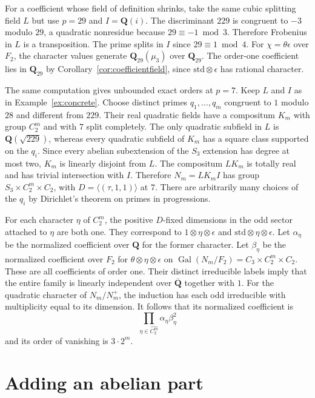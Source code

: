 \documentclass[11pt]{amsart}
\numberwithin{equation}{section}
\theoremstyle{definition}
\theoremstyle{remark}
\newcommand{\Q}{\mathbf Q}
\newcommand{\Qbar}{\overline{\mathbf Q}}
\newcommand{\Gal}{\operatorname{Gal}}
\begin{document}
For a coefficient whose field of definition shrinks,
take the same cubic splitting field $L$ but use $p=29$
and $I=\Q(i)$. The discriminant $229$ is congruent to
$-3$ modulo $29$, a quadratic nonresidue because
$29\equiv-1\bmod 3$. Therefore Frobenius in $L$ is a
transposition. The prime splits in $I$ since
$29\equiv1\bmod4$. For $\chi=\theta\epsilon$ over $F_2$,
the character values generate $\Q_{29}(\mu_3)$ over
$\Q_{29}$. The order-one coefficient lies in $\Q_{29}$
by Corollary~\ref{cor:coefficientfield}, since
$\mathrm{std}\otimes\epsilon$ has rational character.

The same computation gives unbounded exact orders at $p=7$.
Keep $L$ and $I$ as in
Example~\ref{ex:concrete}. Choose distinct primes
$q_1,\ldots,q_m$ congruent to $1$ modulo $28$ and different
from $229$. Their real quadratic fields have a compositum
$K_m$ with group $C_2^m$ and with $7$ split completely.
The only quadratic subfield in $L$ is $\Q(\sqrt{229})$,
whereas every quadratic subfield of $K_m$ has a square
class supported on the $q_i$. Since every abelian
subextension of the $S_3$ extension has degree at most
two, $K_m$ is linearly disjoint from $L$. The compositum
$LK_m$ is totally real and has trivial intersection with
$I$. Therefore $N_m=LK_mI$ has group $S_3\times C_2^m
\times C_2$, with $D=\langle(\tau,1,1)\rangle$ at $7$.
There are arbitrarily many choices of the $q_i$ by
Dirichlet's theorem on primes in progressions.

For each character $\eta$ of $C_2^m$, the positive
$D$-fixed dimensions in the odd sector attached to
$\eta$ are both one. They correspond to
$1\otimes\eta\otimes\epsilon$ and
$\mathrm{std}\otimes\eta\otimes\epsilon$.
Let $\alpha_\eta$ be the normalized coefficient over
$\Q$ for the former character. Let $\beta_\eta$ be the
normalized coefficient over $F_2$ for
$\theta\otimes\eta\otimes\epsilon$ on
$\Gal(N_m/F_2)=C_3\times C_2^m\times C_2$.
These are all coefficients of order one. Their
distinct irreducible labels imply that the entire
family is linearly independent over $\Qbar$ together
with $1$. For the quadratic character of $N_m/N_m^+$,
the induction has each odd irreducible with multiplicity
equal to its dimension. It follows that its normalized
coefficient is
\[
  \prod_{\eta\in\widehat{C_2^m}}\alpha_\eta\beta_\eta^2
\]
and its order of vanishing is $3\cdot2^m$.

\section{Adding an abelian part}
\label{sec:limits}
\end{document}
